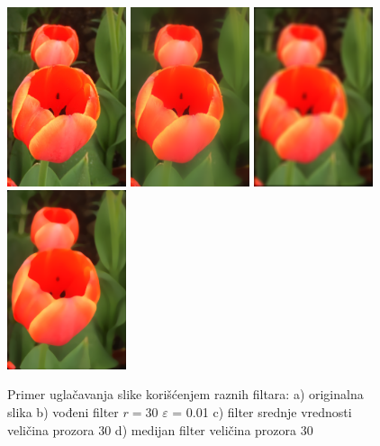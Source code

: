 \documentclass[a4paper,12pt,titlepage]{article}
\begin{document}
\begin{figure}[ht!]
\centering
\includegraphics[width=35mm]{img/flower.png}
\includegraphics[width=35mm]{img/flowerGF30_01.png}
\includegraphics[width=35mm]{img/flowerAvg30.png}
\includegraphics[width=35mm]{img/flowerMed30.png}
\caption{Primer uglačavanja slike korišćenjem raznih filtara: a) originalna slika b) vođeni filter $r = 30$ $\varepsilon$ = 0.01 c) filter srednje vrednosti veličina prozora 30 d) medijan filter veličina prozora 30 }
\label{flowerGF}
\end{figure}
\end{document}
